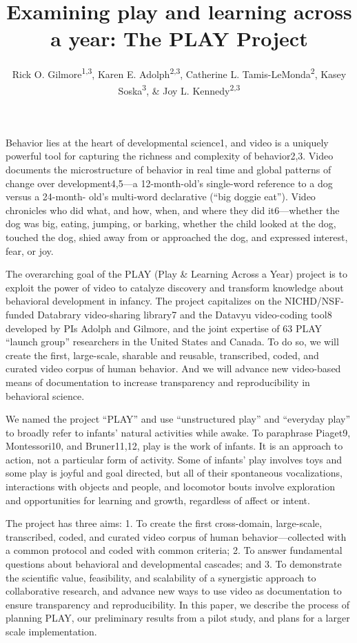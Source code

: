 \documentclass[english,man]{apa6}
\title{Examining play and learning across a year: The PLAY Project}
\author{Rick O. Gilmore\textsuperscript{1,3}, Karen E. Adolph\textsuperscript{2,3}, Catherine L. Tamis-LeMonda\textsuperscript{2}, Kasey Soska\textsuperscript{3}, \& Joy L. Kennedy\textsuperscript{2,3}}
\affiliation{
    \vspace{0.5cm}
          \textsuperscript{1} The Pennsylvania State University\\
          \textsuperscript{2} New York University\\
          \textsuperscript{3} Databrary.org  }
\theoremstyle{definition}
\theoremstyle{definition}
\theoremstyle{definition}
\theoremstyle{remark}
\begin{document}
\maketitle

\setcounter{secnumdepth}{0}



Behavior lies at the heart of developmental science1, and video is a
uniquely powerful tool for capturing the richness and complexity of
behavior2,3. Video documents the microstructure of behavior in real time
and global patterns of change over development4,5---a 12-month-old's
single-word reference to a dog versus a 24-month- old's multi-word
declarative (\enquote{big doggie eat}). Video chronicles who did what,
and how, when, and where they did it6---whether the dog was big, eating,
jumping, or barking, whether the child looked at the dog, touched the
dog, shied away from or approached the dog, and expressed interest,
fear, or joy.

The overarching goal of the PLAY (Play \& Learning Across a Year)
project is to exploit the power of video to catalyze discovery and
transform knowledge about behavioral development in infancy. The project
capitalizes on the NICHD/NSF-funded Databrary video-sharing library7 and
the Datavyu video-coding tool8 developed by PIs Adolph and Gilmore, and
the joint expertise of 63 PLAY \enquote{launch group} researchers in the
United States and Canada. To do so, we will create the first,
large-scale, sharable and reusable, transcribed, coded, and curated
video corpus of human behavior. And we will advance new video-based
means of documentation to increase transparency and reproducibility in
behavioral science.

We named the project \enquote{PLAY} and use \enquote{unstructured play}
and \enquote{everyday play} to broadly refer to infants' natural
activities while awake. To paraphrase Piaget9, Montessori10, and
Bruner11,12, play is the work of infants. It is an approach to action,
not a particular form of activity. Some of infants' play involves toys
and some play is joyful and goal directed, but all of their spontaneous
vocalizations, interactions with objects and people, and locomotor bouts
involve exploration and opportunities for learning and growth,
regardless of affect or intent.

The project has three aims: 1. To create the first cross-domain,
large-scale, transcribed, coded, and curated video corpus of human
behavior---collected with a common protocol and coded with common
criteria; 2. To answer fundamental questions about behavioral and
developmental cascades; and 3. To demonstrate the scientific value,
feasibility, and scalability of a synergistic approach to collaborative
research, and advance new ways to use video as documentation to ensure
transparency and reproducibility. In this paper, we describe the process
of planning PLAY, our preliminary results from a pilot study, and plans
for a larger scale implementation.
\end{document}
